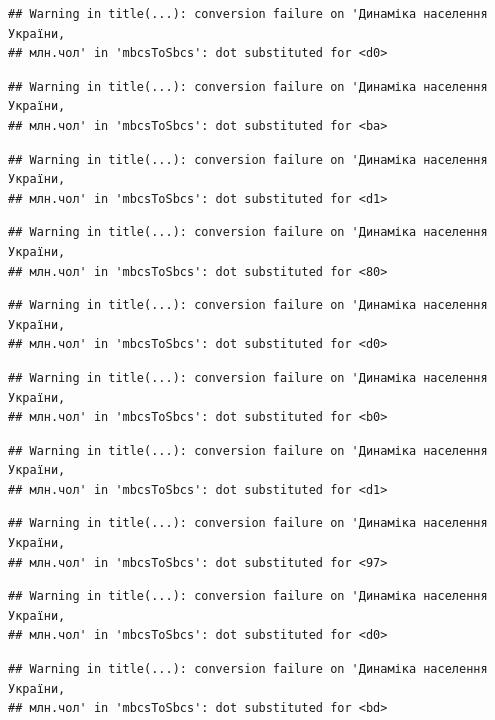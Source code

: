 \documentclass[
]{article}
\begin{document}
\begin{verbatim}
## Warning in title(...): conversion failure on 'Динаміка населення України,
## млн.чол' in 'mbcsToSbcs': dot substituted for <d0>
\end{verbatim}

\begin{verbatim}
## Warning in title(...): conversion failure on 'Динаміка населення України,
## млн.чол' in 'mbcsToSbcs': dot substituted for <ba>
\end{verbatim}

\begin{verbatim}
## Warning in title(...): conversion failure on 'Динаміка населення України,
## млн.чол' in 'mbcsToSbcs': dot substituted for <d1>
\end{verbatim}

\begin{verbatim}
## Warning in title(...): conversion failure on 'Динаміка населення України,
## млн.чол' in 'mbcsToSbcs': dot substituted for <80>
\end{verbatim}

\begin{verbatim}
## Warning in title(...): conversion failure on 'Динаміка населення України,
## млн.чол' in 'mbcsToSbcs': dot substituted for <d0>
\end{verbatim}

\begin{verbatim}
## Warning in title(...): conversion failure on 'Динаміка населення України,
## млн.чол' in 'mbcsToSbcs': dot substituted for <b0>
\end{verbatim}

\begin{verbatim}
## Warning in title(...): conversion failure on 'Динаміка населення України,
## млн.чол' in 'mbcsToSbcs': dot substituted for <d1>
\end{verbatim}

\begin{verbatim}
## Warning in title(...): conversion failure on 'Динаміка населення України,
## млн.чол' in 'mbcsToSbcs': dot substituted for <97>
\end{verbatim}

\begin{verbatim}
## Warning in title(...): conversion failure on 'Динаміка населення України,
## млн.чол' in 'mbcsToSbcs': dot substituted for <d0>
\end{verbatim}

\begin{verbatim}
## Warning in title(...): conversion failure on 'Динаміка населення України,
## млн.чол' in 'mbcsToSbcs': dot substituted for <bd>
\end{verbatim}
\end{document}
